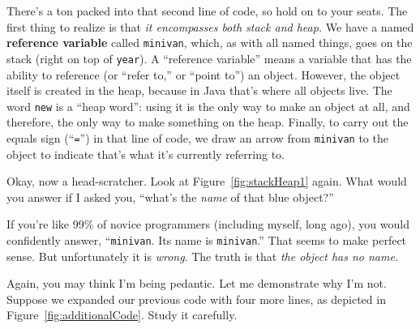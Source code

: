 There's a ton packed into that second line of code, so hold on to your seats.
The first thing to realize is that \textit{it encompasses both stack and
heap.} We have a named \textbf{reference variable} called \texttt{minivan},
which, as with all named things, goes on the stack (right on top of
\texttt{year}). A ``reference variable'' means a variable that has the ability
to reference (or ``refer to,'' or ``point to'') an object. However, the object
itself is created in the heap, because in Java that's where all objects live.
The word \texttt{new} is a ``heap word'': using it is the only way to make an
object at all, and therefore, the only way to make something on the heap.
Finally, to carry out the equals sign (``\texttt{=}'') in that line of code, we
draw an arrow from \texttt{minivan} to the object to indicate that's what it's
currently referring to.

%
%

Okay, now a head-scratcher. Look at Figure~\ref{fig:stackHeap1} again. What
would you answer if I asked you, ``what's the \textit{name} of that blue
object?''

If you're like 99\% of novice programmers (including myself, long ago), you
would confidently answer, ``\texttt{minivan}. Its name is \texttt{minivan}.''
That seems to make perfect sense. But unfortunately it is \textit{wrong}. The
truth is that \textit{the object has no name.}

Again, you may think I'm being pedantic. Let me demonstrate why I'm not.
Suppose we expanded our previous code with four more lines, as depicted in
Figure~\ref{fig:additionalCode}. Study it carefully.


